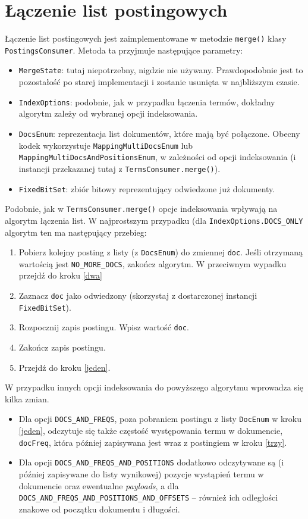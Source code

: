 \section{Łączenie list postingowych}

Łączenie list postingowych jest zaimplementowane w metodzie \texttt{merge()} klasy \texttt{PostingsConsumer}. Metoda ta przyjmuje następujące parametry:
\begin{itemize}
 \item \texttt{MergeState}: tutaj niepotrzebny, nigdzie nie używany. Prawdopodobnie jest to pozostałość po starej implementacji i zostanie usunięta w najbliższym czasie.
 \item \texttt{IndexOptions}: podobnie, jak w przypadku łączenia termów, dokładny algorytm zależy od wybranej opcji indeksowania.
 \item \texttt{DocsEnum}: reprezentacja list dokumentów, które mają być połączone. Obecny kodek wykorzystuje \texttt{MappingMultiDocsEnum} lub \texttt{MappingMultiDocsAndPositionsEnum}, w zależności od opcji indeksowania (i instancji przekazanej tutaj z \texttt{TermsConsumer.merge()}). 
 \item \texttt{FixedBitSet}: zbiór bitowy reprezentujący odwiedzone już dokumenty.
\end{itemize}

Podobnie, jak w \texttt{TermsConsumer.merge()} opcje indeksowania wpływają na algorytm łączenia list. W najprostszym przypadku (dla \texttt{IndexOptions.DOCS\_ONLY} algorytm ten ma następujący przebieg:
\begin{enumerate}
 \item \label{jeden} Pobierz kolejny posting z listy (z \texttt{DocsEnum}) do zmiennej \texttt{doc}. Jeśli otrzymaną wartością jest \texttt{NO\_MORE\_DOCS}, zakończ algorytm. W przeciwnym wypadku przejdź do kroku \ref{dwa}
 \item \label{dwa} Zaznacz \texttt{doc} jako odwiedzony (skorzystaj z dostarczonej instancji \texttt{FixedBitSet}).
 \item \label{trzy} Rozpocznij zapis postingu. Wpisz wartość \texttt{doc}.
 \item Zakończ zapis postingu.
 \item Przejdź do kroku \ref{jeden}.
\end{enumerate}

W przypadku innych opcji indeksowania do powyższego algorytmu wprowadza się kilka zmian.
\begin{itemize}
 \item Dla opcji \texttt{DOCS\_AND\_FREQS}, poza pobraniem postingu z listy \texttt{DocEnum} w kroku \ref{jeden}, odczytuje się także częstość występowania termu w dokumencie, \texttt{docFreq}, która później zapisywana jest wraz z postingiem w kroku \ref{trzy}.
 \item Dla opcji \texttt{DOCS\_AND\_FREQS\_AND\_POSITIONS} dodatkowo odczytywane są (i później zapisywane do listy wynikowej) pozycje wystąpień termu w dokumencie oraz ewentualne \emph{payloads}, a dla \texttt{DOCS\_AND\_FREQS\_AND\_POSITIONS\_AND\_OFFSETS} -- również ich odległości znakowe od początku dokumentu i długości.
\end{itemize}

